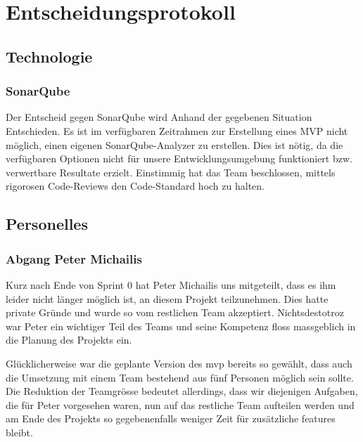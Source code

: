 \documentclass[../main.tex]{subfiles}
\begin{document}
    \section{Entscheidungsprotokoll}
    
    \subsection{Technologie}
    
    \subsubsection{SonarQube}
    \par Der Entscheid gegen SonarQube wird Anhand der gegebenen Situation Entschieden. Es ist im verfügbaren Zeitrahmen zur Erstellung eines MVP nicht möglich, einen eigenen SonarQube-Analyzer zu erstellen. Dies ist nötig, da die verfügbaren Optionen nicht für unsere Entwicklungsumgebung funktioniert bzw. verwertbare Resultate erzielt. Einstimmig hat das Team beschlossen, mittels rigorosen Code-Reviews den Code-Standard hoch zu halten. 
    
    \subsection{Personelles}
    \subsubsection{Abgang Peter Michailis}
    \par Kurz nach Ende von Sprint 0 hat Peter Michailis uns mitgeteilt, dass es ihm leider nicht länger möglich ist, an diesem Projekt teilzunehmen. Dies hatte private Gründe und wurde so vom restlichen Team akzeptiert. Nichtsdestotroz war Peter ein wichtiger Teil des Teams und seine Kompetenz floss massgeblich in die Planung des Projekts ein. 
    \par Glücklicherweise war die geplante Version des \gls{mvp} bereits so gewählt, dass auch die Umsetzung mit einem Team bestehend aus fünf Personen möglich sein sollte. Die Reduktion der Teamgrösse bedeutet allerdings, dass wir diejenigen Aufgaben, die für Peter vorgesehen waren, nun auf das restliche Team aufteilen werden und am Ende des Projekts so gegebenenfalls weniger Zeit für zusätzliche \glspl{feature} bleibt.
\end{document}
